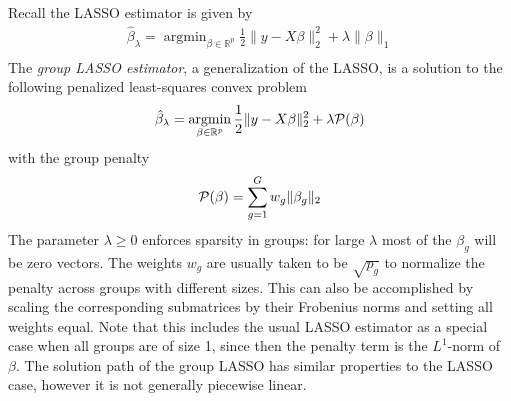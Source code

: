 \documentclass{imsart}
\newcommand{\argmin}{\mathop{\mathrm{argmin}}}
\newcommand{\real}{\mathbb{R}}
\begin{document}
Recall the LASSO estimator is given by
\begin{equation}
\begin{aligned}
\label{eq:LASSO}
\displaystyle \hat \beta_\lambda = \argmin_{\beta \in \real^p} \frac{1}{2} \| y - X \beta \|_2^2 +
   \lambda \| \beta \|_1 \\
\end{aligned}
\end{equation}
The \emph{group LASSO estimator}, a generalization of the LASSO,
 is a solution to the following penalized
least-squares convex problem
\begin{equation}
\begin{aligned}
\label{eq:gsoln}
\displaystyle \hat \beta_\lambda = \argmin_{\beta \in \real^p} \frac{1}{2} \| y - X \beta \|_2^2 +
   \lambda {\cal P}(\beta) \\
\end{aligned}
\end{equation}
with the group penalty
\begin{equation}
  \begin{aligned}
  \label{eq:gpen}
    {\cal P}(\beta)&= \sum_{g=1}^G w_g \| \beta_g \|_2 \\
  \end{aligned}
\end{equation}
The parameter $\lambda \geq 0$ enforces sparsity in groups: for large
$\lambda$ most of the $\beta_g$ will be zero vectors. The weights
$w_g$ are usually taken to be $\sqrt {p_g}$ to normalize the penalty
across groups with different sizes.  This can also be accomplished
by scaling the corresponding submatrices by their Frobenius norms
and setting all weights equal.
Note that this includes the usual LASSO estimator as a
special case when all groups are of size 1, since then the
penalty term is the $L^1$-norm of $\beta$. The solution path of the group
LASSO has similar properties to the LASSO case, however it is not
generally piecewise linear.
\end{document}
